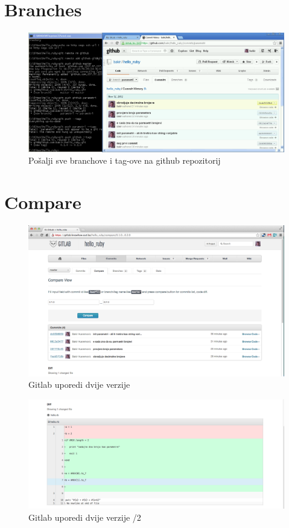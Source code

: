 \documentclass[times, utf8, seminar]{fit}
\begin{document}
\section{Branches}

\begin{figure}[H]
\centering
\includegraphics[width=15cm]{img/github_push_branches_and_tags.png}
\caption{Pošalji sve branchove i tag-ove na github repozitorij}
\end{figure}


\section{Compare}

\begin{figure}[H]
\centering
\includegraphics[width=15cm]{img/gitlab_compare.png}
\caption{Gitlab uporedi dvije verzije}
\end{figure}


\begin{figure}[H]
\centering
\includegraphics[width=15cm]{img/gitlab_compare_2.png}
\caption{Gitlab uporedi dvije verzije /2}
\end{figure}
\end{document}
